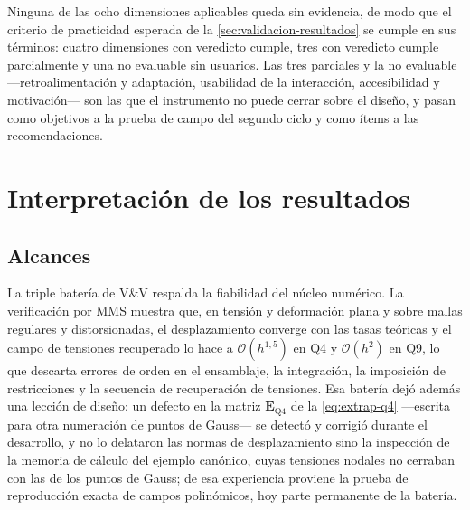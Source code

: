 Ninguna de las ocho dimensiones aplicables queda sin evidencia, de modo que el criterio de practicidad esperada de la \autoref{sec:validacion-resultados} se cumple en sus términos: cuatro dimensiones con veredicto cumple, tres con veredicto cumple parcialmente y una no evaluable sin usuarios. Las tres parciales y la no evaluable —retroalimentación y adaptación, usabilidad de la interacción, accesibilidad y motivación— son las que el instrumento no puede cerrar sobre el diseño, y pasan como objetivos a la prueba de campo del segundo ciclo y como ítems a las recomendaciones.

\section{Interpretación de los resultados}
\label{sec:interpretacion}

\subsection{Alcances}

La triple batería de V\&V respalda la fiabilidad del núcleo numérico. La verificación por MMS muestra que, en tensión y deformación plana y sobre mallas regulares y distorsionadas, el desplazamiento converge con las tasas teóricas y el campo de tensiones recuperado lo hace a $\mathcal{O}(h^{1{,}5})$ en Q4 y $\mathcal{O}(h^{2})$ en Q9, lo que descarta errores de orden en el ensamblaje, la integración, la imposición de restricciones y la secuencia de recuperación de tensiones. Esa batería dejó además una lección de diseño: un defecto en la matriz $\bm{E}_{\text{Q4}}$ de la \autoref{eq:extrap-q4} —escrita para otra numeración de puntos de Gauss— se detectó y corrigió durante el desarrollo, y no lo delataron las normas de desplazamiento sino la inspección de la memoria de cálculo del ejemplo canónico, cuyas tensiones nodales no cerraban con las de los puntos de Gauss; de esa experiencia proviene la prueba de reproducción exacta de campos polinómicos, hoy parte permanente de la batería.

